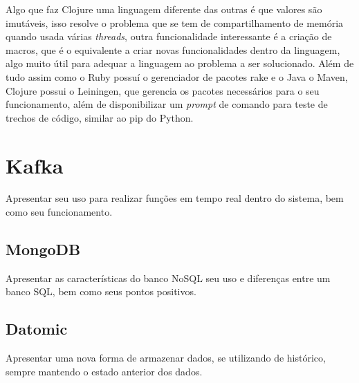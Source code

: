 Algo que faz Clojure uma linguagem diferente das outras é que valores são imutáveis, isso resolve o problema que se tem de compartilhamento de memória quando usada várias \textit{threads}, outra funcionalidade interessante é a criação de macros, que é o equivalente a criar novas funcionalidades dentro da linguagem, algo muito útil para adequar a linguagem ao problema a ser solucionado. Além de tudo assim como o Ruby possuí o gerenciador de pacotes rake e o Java o Maven, Clojure possui o Leiningen, que gerencia os pacotes necessários para o seu funcionamento, além de disponibilizar um \textit{prompt} de comando para teste de trechos de código, similar ao pip do Python.~\cite{hickey2010clojure}

\section{Kafka}
Apresentar seu uso para realizar funções em tempo real dentro do sistema, bem como seu funcionamento.

\subsection{MongoDB}
Apresentar as características do banco NoSQL seu uso e diferenças entre um banco SQL, bem como seus pontos positivos.

\subsection{Datomic}
Apresentar uma nova forma de armazenar dados, se utilizando de histórico, sempre mantendo o estado anterior dos dados.

